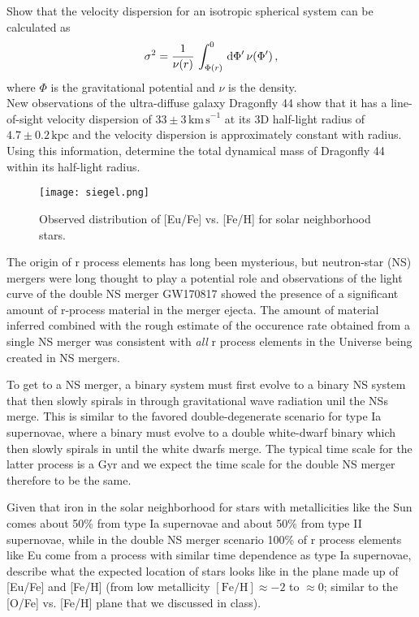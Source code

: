 \documentclass[12pt]{article}
\begin{document}
 Show that the velocity dispersion for an isotropic spherical system can be calculated as
\begin{equation}
\sigma^2 = {1 \over \nu(r)}\,\int_{\Phi(r)}^0\,\mathrm{d} \Phi'\,\nu(\Phi')\,,
\end{equation}
where $\Phi$ is the gravitational potential and $\nu$ is the
density.\\

 New observations of the ultra-diffuse galaxy
Dragonfly 44 show that it has a line-of-sight velocity dispersion of
$33\pm3\,\mathrm{km\,s}^{-1}$ at its 3D half-light radius of
$4.7\pm0.2\,\mathrm{kpc}$ and the velocity dispersion is approximately
constant with radius. Using this information, determine the total
dynamical mass of Dragonfly 44 within its half-light radius.\\

\begin{figure}[htp]
\texttt{[image: siegel.png]}
\caption{Observed distribution of [Eu/Fe] vs. [Fe/H] for solar
  neighborhood stars.}\label{fig:siegel}
\end{figure}

 The origin of r process elements has long been
mysterious, but neutron-star (NS) mergers were long thought to play a
potential role and observations of the light curve of the double NS
merger GW170817 showed the presence of a significant amount of
r-process material in the merger ejecta. The amount of material
inferred combined with the rough estimate of the occurence rate
obtained from a single NS merger was consistent with \emph{all} r
process elements in the Universe being created in NS mergers.

To get to a NS merger, a binary system must first evolve to a binary
NS system that then slowly spirals in through gravitational wave
radiation unil the NSs merge. This is similar to the favored
double-degenerate scenario for type Ia supernovae, where a binary must
evolve to a double white-dwarf binary which then slowly spirals in
until the white dwarfs merge. The typical time scale for the latter
process is a Gyr and we expect the time scale for the double NS merger
therefore to be the same.

Given that iron in the solar neighborhood for stars with metallicities
like the Sun comes about 50\% from type Ia supernovae and about 50\%
from type II supernovae, while in the double NS merger scenario 100\%
of r process elements like Eu come from a process with similar time
dependence as type Ia supernovae, describe what the expected location
of stars looks like in the plane made up of [Eu/Fe] and [Fe/H] (from
low metallicity $[\mathrm{Fe/H}] \approx -2$ to $\approx 0$; similar
to the [O/Fe] vs. [Fe/H] plane that we discussed in class).
\end{document}
